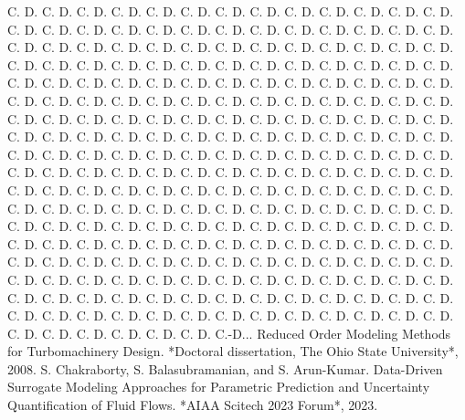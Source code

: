 \documentclass[12pt, a4paper]{report}
\begin{document}
\begin{thebibliography}{99}
C. D. C. D. C. D. C. D. C. D. C. D. C. D. C. D. C. D. C. D. C. D. C. D. C. D. C. D. C. D. C. D. C. D. C. D. C. D. C. D. C. D. C. D. C. D. C. D. C. D. C. D. C. D. C. D. C. D. C. D. C. D. C. D. C. D. C. D. C. D. C. D. C. D. C. D. C. D. C. D. C. D. C. D. C. D. C. D. C. D. C. D. C. D. C. D. C. D. C. D. C. D. C. D. C. D. C. D. C. D. C. D. C. D. C. D. C. D. C. D. C. D. C. D. C. D. C. D. C. D. C. D. C. D. C. D. C. D. C. D. C. D. C. D. C. D. C. D. C. D. C. D. C. D. C. D. C. D. C. D. C. D. C. D. C. D. C. D. C. D. C. D. C. D. C. D. C. D. C. D. C. D. C. D. C. D. C. D. C. D. C. D. C. D. C. D. C. D. C. D. C. D. C. D. C. D. C. D. C. D. C. D. C. D. C. D. C. D. C. D. C. D. C. D. C. D. C. D. C. D. C. D. C. D. C. D. C. D. C. D. C. D. C. D. C. D. C. D. C. D. C. D. C. D. C. D. C. D. C. D. C. D. C. D. C. D. C. D. C. D. C. D. C. D. C. D. C. D. C. D. C. D. C. D. C. D. C. D. C. D. C. D. C. D. C. D. C. D. C. D. C. D. C. D. C. D. C. D. C. D. C. D. C. D. C. D. C. D. C. D. C. D. C. D. C. D. C. D. C. D. C. D. C. D. C. D. C. D. C. D. C. D. C. D. C. D. C. D. C. D. C. D. C. D. C. D. C. D. C. D. C. D. C. D. C. D. C. D. C. D. C. D. C. D. C. D. C. D. C. D. C. D. C. D. C. D. C. D. C. D. C. D. C. D. C. D. C. D. C. D. C. D. C. D. C. D. C. D. C. D. C. D. C. D. C. D. C. D. C. D. C. D. C. D. C. D. C. D. C. D. C. D. C. D. C. D. C. D. C. D. C. D. C. D. C. D. C. D. C. D. C. D. C. D. C. D. C. D. C. D. C. D. C. D. C. D. C. D. C. D. C. D. C. D. C. D. C. D. C. D. C.-D... Reduced Order Modeling Methods for Turbomachinery Design. *Doctoral dissertation, The Ohio State University*, 2008.
     S. Chakraborty, S. Balasubramanian, and S. Arun-Kumar. Data-Driven Surrogate Modeling Approaches for Parametric Prediction and Uncertainty Quantification of Fluid Flows. *AIAA Scitech 2023 Forum*, 2023.

\end{thebibliography}
\end{document}
